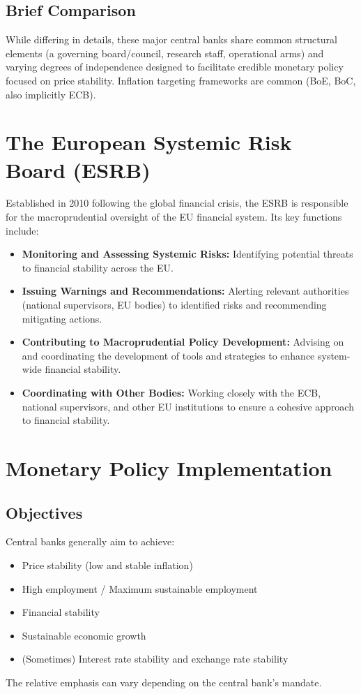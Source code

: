 \subsection{Brief Comparison}
While differing in details, these major central banks share common structural elements (a governing board/council, research staff, operational arms) and varying degrees of independence designed to facilitate credible monetary policy focused on price stability. Inflation targeting frameworks are common (BoE, BoC, also implicitly ECB).

\section{The European Systemic Risk Board (ESRB)}

Established in 2010 following the global financial crisis, the ESRB is responsible for the macroprudential oversight of the EU financial system. Its key functions include:
\begin{itemize}
    \item \textbf{Monitoring and Assessing Systemic Risks:} Identifying potential threats to financial stability across the EU.
    \item \textbf{Issuing Warnings and Recommendations:} Alerting relevant authorities (national supervisors, EU bodies) to identified risks and recommending mitigating actions.
    \item \textbf{Contributing to Macroprudential Policy Development:} Advising on and coordinating the development of tools and strategies to enhance system-wide financial stability.
    \item \textbf{Coordinating with Other Bodies:} Working closely with the ECB, national supervisors, and other EU institutions to ensure a cohesive approach to financial stability.
\end{itemize}

\section{Monetary Policy Implementation}

\subsection{Objectives}
Central banks generally aim to achieve:
\begin{itemize}
    \item Price stability (low and stable inflation)
    \item High employment / Maximum sustainable employment
    \item Financial stability
    \item Sustainable economic growth
    \item (Sometimes) Interest rate stability and exchange rate stability
\end{itemize}
The relative emphasis can vary depending on the central bank's mandate.

